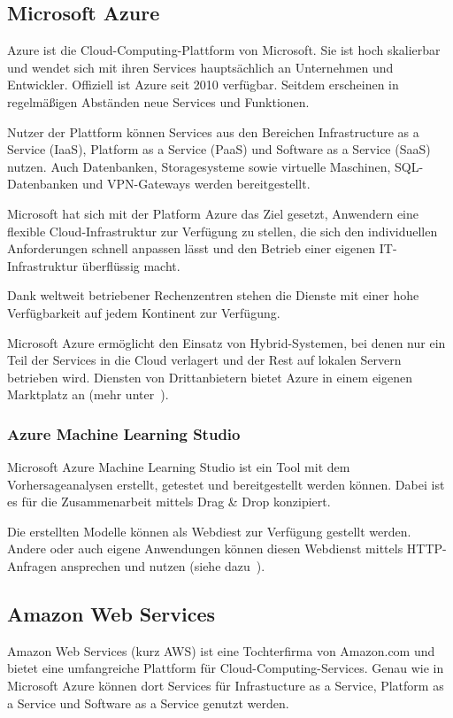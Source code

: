 \subsection{Microsoft Azure}
Azure ist die Cloud-Computing-Plattform von Microsoft. Sie ist hoch skalierbar und wendet sich mit ihren Services
hauptsächlich an Unternehmen und Entwickler. Offiziell ist Azure seit 2010 verfügbar. Seitdem erscheinen in regelmäßigen
Abständen neue Services und Funktionen.

Nutzer der Plattform können Services aus den Bereichen Infrastructure as a Service (IaaS), Platform as a Service (PaaS)
und Software as a Service (SaaS) nutzen. Auch Datenbanken, Storagesysteme sowie virtuelle Maschinen, SQL-Datenbanken und
VPN-Gateways werden bereitgestellt.

Microsoft hat sich mit der Platform Azure das Ziel gesetzt, Anwendern eine flexible Cloud-Infrastruktur zur Verfügung
zu stellen, die sich den individuellen Anforderungen schnell anpassen lässt und den Betrieb einer eigenen
IT-Infrastruktur überflüssig macht.

Dank weltweit betriebener Rechenzentren stehen die Dienste mit einer hohe Verfügbarkeit auf jedem Kontinent zur
Verfügung.

Microsoft Azure ermöglicht den Einsatz von Hybrid-Systemen, bei denen nur ein Teil der Services in die Cloud verlagert
und der Rest auf lokalen Servern betrieben wird. Diensten von Drittanbietern bietet Azure in einem eigenen Marktplatz an
(mehr unter~\cite{online_grundlagen_azure}).

\subsubsection{Azure Machine Learning Studio}
Microsoft Azure Machine Learning Studio ist ein Tool mit dem Vorhersageanalysen erstellt, getestet und bereitgestellt
werden können. Dabei ist es für die Zusammenarbeit mittels Drag \& Drop konzipiert.

Die erstellten Modelle können als Webdiest zur Verfügung gestellt werden. Andere oder auch eigene Anwendungen können
diesen Webdienst mittels HTTP-Anfragen ansprechen und nutzen (siehe dazu~\cite{article_grundlagen_azure_studio}).

\subsection{Amazon Web Services}
Amazon Web Services (kurz AWS) ist eine Tochterfirma von Amazon.com und bietet eine umfangreiche Plattform für
Cloud-Computing-Services. Genau wie in Microsoft Azure können dort Services für Infrastucture as a Service, Platform as
a Service und Software as a Service genutzt werden.

